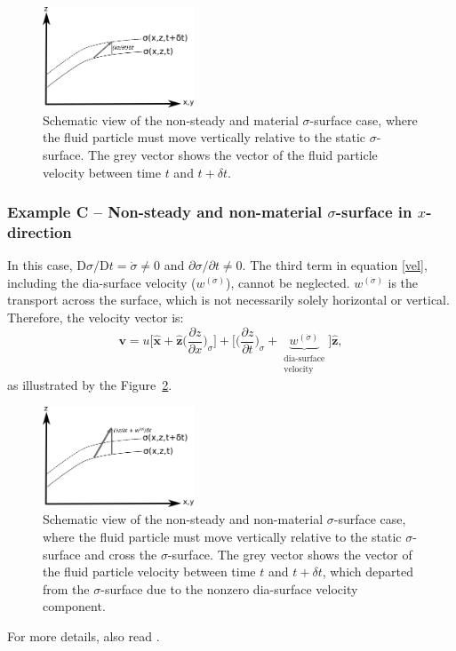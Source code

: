 \begin{figure}[h!]
	\centering
	\includegraphics[width=0.4\textwidth]{figures/lecture13_exampleB.png} 
	\caption{Schematic view of the non-steady and material $\sigma$-surface case, where the fluid particle must move vertically relative to the static $\sigma$-surface. The grey vector shows the vector of the fluid particle velocity between time $t$ and $t+\delta t$.}
	\label{exB}
\end{figure}


\subsubsection*{Example C -- Non-steady and non-material $\sigma$-surface in $x$-direction} 

In this case, $\mathrm{D}\sigma/\mathrm{D}t = \dot{\sigma} \neq 0$ and $\partial \sigma/ \partial t \neq 0$. The third term in equation \eqref{vel}, including the dia-surface velocity ($w^{(\dot{\sigma})}$), cannot be neglected. $w^{(\dot{\sigma})}$ is the transport across the surface, which is not necessarily solely horizontal or vertical. Therefore, the velocity vector is:
\begin{equation}
\boldsymbol{v} = u\bigg [\boldsymbol{\hat{x}} + \boldsymbol{\hat{z}}  \bigg (\frac{\partial z}{\partial x} \bigg )_\sigma \bigg]
+ \bigg [ \bigg (\frac{\partial z}{\partial t}\bigg )_\sigma + \underbrace{w^{(\dot{\sigma})}}_{\substack{\text{dia-surface}\\\text{velocity}}} \bigg]\boldsymbol{\hat{z}} ,
\end{equation}
as illustrated by the Figure~\ref{exC}.

\begin{figure}[h!]
	\centering
	\includegraphics[width=0.4\textwidth]{figures/lecture13_exampleC.png}
	\caption{Schematic view of the non-steady and non-material $\sigma$-surface case, where the fluid particle must move vertically relative to the static $\sigma$-surface and cross the $\sigma$-surface. The grey vector shows the vector of the fluid particle velocity between time $t$ and $t+\delta t$, which departed from the $\sigma$-surface due to the nonzero dia-surface velocity component.}
	\label{exC}
\end{figure}

For more details, also read \citep[Chapter 18.3-18.6 in][]{Griffies2019}.